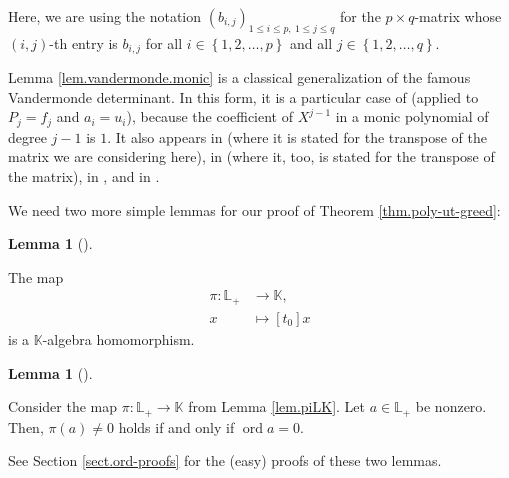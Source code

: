 \documentclass[numbers=enddot,12pt,final,onecolumn,notitlepage]{scrartcl}%
\theoremstyle{definition}
\newtheorem{lem}[theo]{Lemma}
\newenvironment{lemma}[1][]
{\begin{lem}[#1]\begin{leftbar}}
{\end{leftbar}\end{lem}}
\renewcommand{\leq}{\leqslant}
\theoremstyle{plainsl}
\begin{document}
\noindent Here, we are using the notation $\left(  b_{i,j}\right)  _{1\leq
i\leq p,\ 1\leq j\leq q}$ for the $p\times q$-matrix whose $\left(
i,j\right)  $-th entry is $b_{i,j}$ for all $i\in\left\{  1,2,\ldots
,p\right\}  $ and all $j\in\left\{  1,2,\ldots,q\right\}  $.

Lemma \ref{lem.vandermonde.monic} is a classical generalization of the famous
Vandermonde determinant. In this form, it is a particular case of
\cite[Theorem 2]{hyperfact} (applied to $P_{j}=f_{j}$ and $a_{i}=u_{i}$),
because the coefficient of $X^{j-1}$ in a monic polynomial of degree $j-1$ is
$1$. It also appears in \cite[Exercise 267]{FadSom72} (where it is stated for
the transpose of the matrix we are considering here), in \cite[Chapter
XI,\ Exercise 2 in Set XVIII]{Muir60} (where it, too, is stated for the
transpose of the matrix), in \cite[Proposition 1]{Kratte99}, and in
\cite[Exercise 6.62]{detnotes}.

We need two more simple lemmas for our proof of Theorem
\ref{thm.poly-ut-greed}:

\begin{lemma}
\label{lem.piLK}The map%
\begin{align*}
\pi:\mathbb{L}_{+}  &  \rightarrow\mathbb{K},\\
x  &  \mapsto\left[  t_{0}\right]  x
\end{align*}
is a $\mathbb{K}$-algebra homomorphism.
\end{lemma}

\begin{lemma}
\label{lem.pinot0}Consider the map $\pi:\mathbb{L}_{+}\rightarrow\mathbb{K}$
from Lemma \ref{lem.piLK}. Let $a\in\mathbb{L}_{+}$ be nonzero. Then,
$\pi\left(  a\right)  \neq0$ holds if and only if $\operatorname*{ord}a=0$.
\end{lemma}

See Section \ref{sect.ord-proofs} for the (easy) proofs of these two lemmas.
\end{document}
